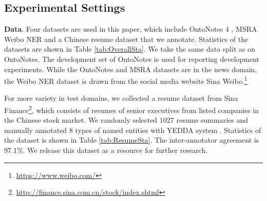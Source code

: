 \documentclass[11pt,a4paper]{article}
\begin{document}
\begin{CJK*}{UTF8}{gbsn}
\subsection{Experimental Settings}
\textbf{Data}. Four datasets are used in this paper, which include OntoNotes 4 \cite{weischedel2011ontonotes}, MSRA \cite{levow2006third} Weibo NER \cite{peng2015named,he2017f} and a Chinese resume dataset that we annotate. Statistics of the datasets are shown in Table \ref{tab:OverallSta}. We take the same data split as \citet{che2013named} on OntoNotes. The development set of OntoNotes is used for reporting development experiments. While the OntoNotes and MSRA datasets are in the news domain, the Weibo NER dataset is drawn from the social media website Sina Weibo.\footnote{\url{https://www.weibo.com/}}

\begin{table}[!tp]
\begin{center}
\end{center}
\caption{Detailed statistics of resume NER.}
\label{tab:ResumeSta}
\end{table}


For more variety in test domains, we collected a resume dataset from Sina Finance\footnote{\url{http://finance.sina.com.cn/stock/index.shtml}}, which consists of resumes of senior executives from listed companies in the Chinese stock market. We randomly selected 1027 resume summaries and manually annotated 8 types of named entities with YEDDA system \cite{yang2017yedda}. Statistics of the dataset is shown in Table \ref{tab:ResumeSta}. The inter-annotator agreement is 97.1\%. We release this dataset as a resource for further research.


\end{CJK*}
\end{document}
